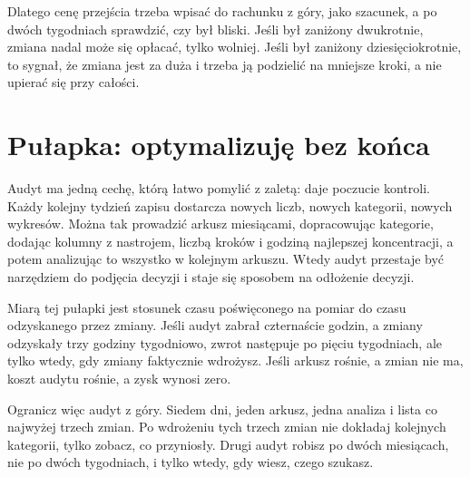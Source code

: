 Dlatego cenę przejścia trzeba wpisać do rachunku z góry, jako szacunek, a po dwóch tygodniach sprawdzić, czy był bliski. Jeśli był zaniżony dwukrotnie, zmiana nadal może się opłacać, tylko wolniej. Jeśli był zaniżony dziesięciokrotnie, to sygnał, że zmiana jest za duża i trzeba ją podzielić na mniejsze kroki, a nie upierać się przy całości.

\section{Pułapka: optymalizuję bez końca}

Audyt ma jedną cechę, którą łatwo pomylić z zaletą: daje poczucie kontroli. Każdy kolejny tydzień zapisu dostarcza nowych liczb, nowych kategorii, nowych wykresów. Można tak prowadzić arkusz miesiącami, dopracowując kategorie, dodając kolumny z nastrojem, liczbą kroków i godziną najlepszej koncentracji, a potem analizując to wszystko w kolejnym arkuszu. Wtedy audyt przestaje być narzędziem do podjęcia decyzji i staje się sposobem na odłożenie decyzji.

Miarą tej pułapki jest stosunek czasu poświęconego na pomiar do czasu odzyskanego przez zmiany. Jeśli audyt zabrał czternaście godzin, a zmiany odzyskały trzy godziny tygodniowo, zwrot następuje po pięciu tygodniach, ale tylko wtedy, gdy zmiany faktycznie wdrożysz. Jeśli arkusz rośnie, a zmian nie ma, koszt audytu rośnie, a zysk wynosi zero.

Ogranicz więc audyt z góry. Siedem dni, jeden arkusz, jedna analiza i lista co najwyżej trzech zmian. Po wdrożeniu tych trzech zmian nie dokładaj kolejnych kategorii, tylko zobacz, co przyniosły. Drugi audyt robisz po dwóch miesiącach, nie po dwóch tygodniach, i tylko wtedy, gdy wiesz, czego szukasz.

